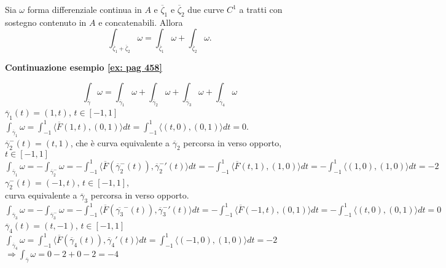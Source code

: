 \begin{proposition}
	Sia $\omega$ forma differenziale continua in $A$ e $\overline{\zeta}_1$ e $\overline{\zeta}_2$ due curve $C^1$ a tratti con sostegno contenuto in $A$ e concatenabili. Allora
	\begin{equation*}
		\int_{\overline{\zeta}_1+\overline{\zeta}_2}\omega= \int_{\overline{\zeta}_1}\omega + \int_{\overline{\zeta}_2}\omega.
	\end{equation*}
\end{proposition}


\begin{exbar}
	\textbf{Continuazione esempio \ref{ex: pag 458}}
	
	\begin{equation*}
		\int_{\overline{\gamma}}\omega=\int_{\overline{\gamma}_1}\omega+\int_{\overline{\gamma}_2}\omega + \int_{\overline{\gamma}_3}\omega + \int_{\overline{\gamma}_4} \omega
	\end{equation*}
	$\overline{\gamma}_1(t)=(1,t)$, $t \in [-1,1]$\\
	$\int_{\overline{\gamma}_1}\omega =\int_{-1}^1 \langle \overline{F}(1,t), (0,1)\rangle dt = \int_{-1}^1 \langle (t,0), (0,1)\rangle dt=0$.\\
	$\overline{\gamma}_2^-(t)=(t,1)$, che è curva equivalente a $\overline{\gamma}_2$ percorsa in verso opporto, $t\in[-1,1]$\\
	$\int_{\overline{\gamma}_1}\omega= -\int_{\overline{\gamma}_2^-}\omega =-\int_{-1}^1 \langle 
	\overline{F}(\overline{\gamma}_2^- (t)),\overline{\gamma}_2^-'(t)\rangle dt=-\int_{-1}^1 \langle 
	\overline{F} (t,1),(1,0)\rangle dt = -\int_{-1}^1 \langle (1,0),(1,0) \rangle dt=-2$\\
	$\gamma_2^-(t)=(-1,t)$, $t \in [-1,1]$,\\
	curva equivalente a $\overline{\gamma}_3$ percorsa in verso opporto.\\
	$\int_{\overline{\gamma}_3}\omega= -\int_{\overline{\gamma}_3^-}\omega =-\int_{-1}^1 \langle \overline{F}(\overline{\gamma_3}^-(t)), \overline{\gamma}_3^- ' (t) \rangle dt = -\int_{-1}^1 \langle \overline{F}(-1,t),(0,1) \rangle dt=-\int_{-1}^1 \langle (t,0),(0,1) \rangle dt =0$\\
	$\overline{\gamma}_4(t)=(t,-1)$, $ t \in [-1,1]$\\
	$\int_{\overline{\gamma}_4}\omega = \int_{-1}^1 \langle \overline{F}(\overline{\gamma}_4(t)),\overline{\gamma}_4'(t) \rangle dt= \int_{-1}^1 \langle (-1,0),(1,0) \rangle dt=-2$\\
	$\Rightarrow \int_{\overline{\gamma}}\omega =0-2+0-2=-4$
\end{exbar}


